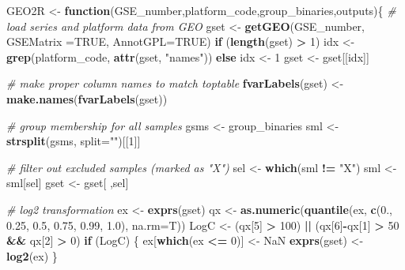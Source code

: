 \documentclass[
]{article}
\newenvironment{Shaded}{\begin{snugshade}}{\end{snugshade}}
\newcommand{\CommentTok}[1]{\textcolor[rgb]{0.56,0.35,0.01}{\textit{#1}}}
\newcommand{\ControlFlowTok}[1]{\textcolor[rgb]{0.13,0.29,0.53}{\textbf{#1}}}
\newcommand{\DataTypeTok}[1]{\textcolor[rgb]{0.13,0.29,0.53}{#1}}
\newcommand{\DecValTok}[1]{\textcolor[rgb]{0.00,0.00,0.81}{#1}}
\newcommand{\FloatTok}[1]{\textcolor[rgb]{0.00,0.00,0.81}{#1}}
\newcommand{\KeywordTok}[1]{\textcolor[rgb]{0.13,0.29,0.53}{\textbf{#1}}}
\newcommand{\NormalTok}[1]{#1}
\newcommand{\OperatorTok}[1]{\textcolor[rgb]{0.81,0.36,0.00}{\textbf{#1}}}
\newcommand{\OtherTok}[1]{\textcolor[rgb]{0.56,0.35,0.01}{#1}}
\newcommand{\StringTok}[1]{\textcolor[rgb]{0.31,0.60,0.02}{#1}}
\begin{document}
\begin{Shaded}
\begin{Highlighting}[]
\NormalTok{GEO2R <-}\StringTok{ }\ControlFlowTok{function}\NormalTok{(GSE_number,platform_code,group_binaries,outputs)\{}
  \CommentTok{# load series and platform data from GEO}
\NormalTok{  gset <-}\StringTok{ }\KeywordTok{getGEO}\NormalTok{(GSE_number, }\DataTypeTok{GSEMatrix =}\OtherTok{TRUE}\NormalTok{, }\DataTypeTok{AnnotGPL=}\OtherTok{TRUE}\NormalTok{)}
  \ControlFlowTok{if}\NormalTok{ (}\KeywordTok{length}\NormalTok{(gset) }\OperatorTok{>}\StringTok{ }\DecValTok{1}\NormalTok{) idx <-}\StringTok{ }\KeywordTok{grep}\NormalTok{(platform_code, }\KeywordTok{attr}\NormalTok{(gset, }\StringTok{"names"}\NormalTok{)) }\ControlFlowTok{else}\NormalTok{ idx <-}\StringTok{ }\DecValTok{1}
\NormalTok{  gset <-}\StringTok{ }\NormalTok{gset[[idx]]}
  
  \CommentTok{# make proper column names to match toptable }
  \KeywordTok{fvarLabels}\NormalTok{(gset) <-}\StringTok{ }\KeywordTok{make.names}\NormalTok{(}\KeywordTok{fvarLabels}\NormalTok{(gset))}
  
  \CommentTok{# group membership for all samples}
\NormalTok{  gsms <-}\StringTok{ }\NormalTok{group_binaries}
\NormalTok{  sml <-}\StringTok{ }\KeywordTok{strsplit}\NormalTok{(gsms, }\DataTypeTok{split=}\StringTok{""}\NormalTok{)[[}\DecValTok{1}\NormalTok{]]}
  
  \CommentTok{# filter out excluded samples (marked as "X")}
\NormalTok{  sel <-}\StringTok{ }\KeywordTok{which}\NormalTok{(sml }\OperatorTok{!=}\StringTok{ "X"}\NormalTok{)}
\NormalTok{  sml <-}\StringTok{ }\NormalTok{sml[sel]}
\NormalTok{  gset <-}\StringTok{ }\NormalTok{gset[ ,sel]}
  
  \CommentTok{# log2 transformation}
\NormalTok{  ex <-}\StringTok{ }\KeywordTok{exprs}\NormalTok{(gset)}
\NormalTok{  qx <-}\StringTok{ }\KeywordTok{as.numeric}\NormalTok{(}\KeywordTok{quantile}\NormalTok{(ex, }\KeywordTok{c}\NormalTok{(}\FloatTok{0.}\NormalTok{, }\FloatTok{0.25}\NormalTok{, }\FloatTok{0.5}\NormalTok{, }\FloatTok{0.75}\NormalTok{, }\FloatTok{0.99}\NormalTok{, }\FloatTok{1.0}\NormalTok{), }\DataTypeTok{na.rm=}\NormalTok{T))}
\NormalTok{  LogC <-}\StringTok{ }\NormalTok{(qx[}\DecValTok{5}\NormalTok{] }\OperatorTok{>}\StringTok{ }\DecValTok{100}\NormalTok{) }\OperatorTok{||}
\StringTok{            }\NormalTok{(qx[}\DecValTok{6}\NormalTok{]}\OperatorTok{-}\NormalTok{qx[}\DecValTok{1}\NormalTok{] }\OperatorTok{>}\StringTok{ }\DecValTok{50} \OperatorTok{&&}\StringTok{ }\NormalTok{qx[}\DecValTok{2}\NormalTok{] }\OperatorTok{>}\StringTok{ }\DecValTok{0}\NormalTok{)}
  \ControlFlowTok{if}\NormalTok{ (LogC) \{ ex[}\KeywordTok{which}\NormalTok{(ex }\OperatorTok{<=}\StringTok{ }\DecValTok{0}\NormalTok{)] <-}\StringTok{ }\OtherTok{NaN}
    \KeywordTok{exprs}\NormalTok{(gset) <-}\StringTok{ }\KeywordTok{log2}\NormalTok{(ex) \}}
  

\end{Highlighting}
\end{Shaded}
\end{document}
